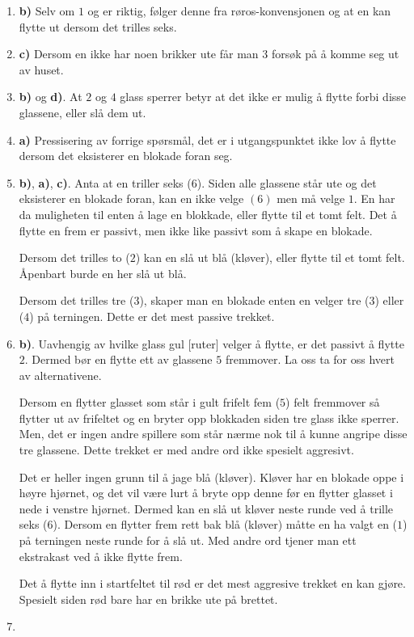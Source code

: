 \documentclass[10pt,a4paper,norsk,openany]{book}
\begin{document}
\begin{enumerate}
  \item \textbf{b)} Selv om $1$ og er riktig, følger denne fra
    røros-konvensjonen og at en kan flytte ut dersom det trilles seks.
  \item \textbf{c)} Dersom en ikke har noen brikker ute får man $3$ forsøk på
    å komme seg ut av huset.
  \item \textbf{b)} og \textbf{d)}. At $2$ og $4$ glass sperrer betyr at
    det ikke er mulig å flytte forbi disse glassene, eller slå dem ut.
  \item \textbf{a)} Pressisering av forrige spørsmål, det er i utgangspunktet
    ikke lov å flytte dersom det eksisterer en blokade foran seg.
  \item \textbf{b)}, \textbf{a)}, \textbf{c)}. Anta at en triller seks ($6$).
    Siden alle glassene står ute og det eksisterer en blokade foran, kan en ikke
    velge $(6)$ men må velge
    $1$. En har da muligheten til enten å lage en blokkade, eller flytte til et
    tomt felt. Det å flytte en frem er passivt, men ikke like passivt som å
    skape en blokade.

    Dersom det trilles to ($2$) kan en slå ut blå (kløver), eller flytte til et
    tomt felt. Åpenbart burde en her slå ut blå.

    Dersom det trilles tre ($3$), skaper man en blokade enten en velger tre
    ($3$) eller ($4$) på terningen. Dette er det mest passive trekket.
  \item \textbf{b)}. Uavhengig av hvilke glass gul [ruter] velger å flytte,
    er det passivt å flytte $2$. Dermed bør en flytte ett av glassene $5$
    fremmover. La oss ta for oss hvert av alternativene.

    Dersom en flytter glasset som står i gult frifelt fem ($5$) felt fremmover
    så flytter ut av frifeltet og en bryter opp blokkaden siden tre
    glass ikke sperrer. Men, det er ingen andre spillere som står nærme nok til
    å kunne angripe disse tre glassene. Dette trekket er med andre ord ikke
    spesielt aggresivt.

    Det er heller ingen grunn til å jage blå (kløver). Kløver har en blokade
    oppe i høyre hjørnet, og det vil være lurt å bryte opp denne før en flytter
    glasset i nede i venstre hjørnet. Dermed kan en slå ut kløver neste runde
    ved å trille seks ($6$). Dersom en flytter frem rett bak blå
    (kløver) måtte en ha valgt en ($1$) på terningen neste runde for å slå ut.
    Med andre ord tjener man ett ekstrakast ved å ikke flytte frem.

    Det å flytte inn i startfeltet til rød er det mest aggresive trekket en kan
    gjøre. Spesielt siden rød bare har en brikke ute på brettet.
  \item 
\end{enumerate}
\end{document}
